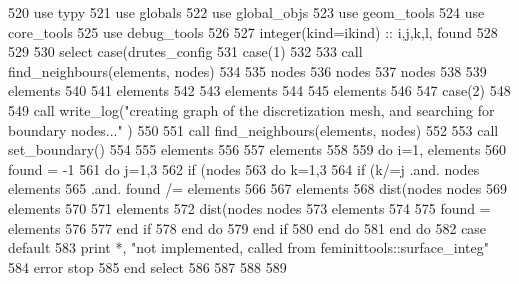 \begin{DoxyCode}
520         \textcolor{keywordtype}{use }typy
521         \textcolor{keywordtype}{use }globals
522         \textcolor{keywordtype}{use }global_objs
523         \textcolor{keywordtype}{use }geom_tools
524         \textcolor{keywordtype}{use }core_tools
525         \textcolor{keywordtype}{use }debug_tools
526 
527         \textcolor{keywordtype}{integer(kind=ikind)} :: i,j,k,l, found
528 
529 
530         \textcolor{keywordflow}{select case}(drutes_config%
531           \textcolor{keywordflow}{case}(1)
532           
533             \textcolor{keyword}{call }find_neighbours(elements, nodes)
534   
535             nodes%
536             nodes%
537             nodes%
538 
539             elements%
540 
541             elements%
542 
543             elements%
544 
545             elements%
546 
547           \textcolor{keywordflow}{case}(2)
548           
549             \textcolor{keyword}{call }write_log(\textcolor{stringliteral}{"creating graph of the discretization mesh, and searching for boundary nodes..."}
      )
550             
551             \textcolor{keyword}{call }find_neighbours(elements, nodes)
552             
553             \textcolor{keyword}{call }set_boundary()
554 
555             elements%
556 
557             elements%
558 
559             \textcolor{keywordflow}{do} i=1, elements%
560               found = -1
561               \textcolor{keywordflow}{do} j=1,3
562                 \textcolor{keywordflow}{if} (nodes%
563                   \textcolor{keywordflow}{do} k=1,3
564                     \textcolor{keywordflow}{if} (k/=j .and. nodes%
      elements%
565                           .and. found /= elements%
566 
567                       elements%
568                                              dist(nodes%
      nodes%
569                       elements%
570 
571                       elements%
572                                               dist(nodes%
      nodes%
573                       elements%
574 
575                       found = elements%
576 
577 \textcolor{keywordflow}{                    end if}
578 \textcolor{keywordflow}{                  end do}
579 \textcolor{keywordflow}{                end if}
580 \textcolor{keywordflow}{              end do}
581 \textcolor{keywordflow}{            end do}
582 \textcolor{keywordflow}{          case default}
583             print *, \textcolor{stringliteral}{"not implemented, called from feminittools::surface\_integ"}
584             error stop
585 \textcolor{keywordflow}{        end select}
586             
587             
588 
589         
\end{DoxyCode}


